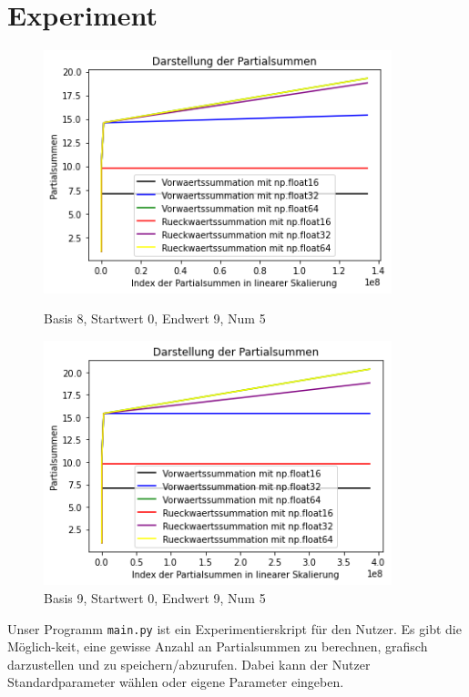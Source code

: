 \documentclass{scrreprt}
\begin{document}
\section{Experiment} \label{sec:experiment}
\begin{figure}
    \centering
    \includegraphics[width=0.9\textwidth]{plot_basis8_endwert9.png}
    \caption{Basis 8, Startwert 0, Endwert 9, Num 5}
    \label{fig:basis8}
    \vspace*{15mm}
    \includegraphics[width=0.9\textwidth]{plot_basis9_endwert9.png}
    \caption{Basis 9, Startwert 0, Endwert 9, Num 5}
    \label{fig:basis9}
\end{figure}

Unser Programm \texttt{main.py} ist ein Experimentierskript für den Nutzer. Es gibt die Möglich-keit, eine gewisse Anzahl an Partialsummen zu berechnen, grafisch darzustellen und zu speichern/abzurufen. Dabei kann der Nutzer Standardparameter wählen oder eigene Parameter eingeben. \\
\end{document}
